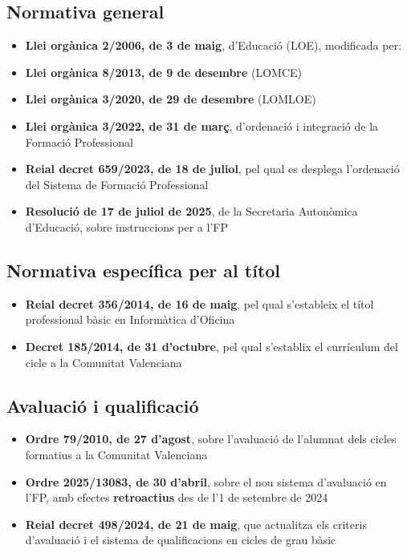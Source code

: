 \documentclass[
  paper=a4,
  ,captions=tableheading
]{scrartcl}
\providecommand{\tightlist}{%
  \setlength{\itemsep}{0pt}\setlength{\parskip}{0pt}}
\begin{document}
\hypertarget{normativa-general}{%
\subsection{Normativa general}\label{normativa-general}}

\begin{itemize}
\tightlist
\item
  \textbf{Llei orgànica 2/2006, de 3 de maig}, d'Educació (LOE),
  modificada per:
\item
  \textbf{Llei orgànica 8/2013, de 9 de desembre} (LOMCE)
\item
  \textbf{Llei orgànica 3/2020, de 29 de desembre} (LOMLOE)
\item
  \textbf{Llei orgànica 3/2022, de 31 de març}, d'ordenació i integració
  de la Formació Professional
\item
  \textbf{Reial decret 659/2023, de 18 de juliol}, pel qual es desplega
  l'ordenació del Sistema de Formació Professional
\item
  \textbf{Resolució de 17 de juliol de 2025}, de la Secretaria
  Autonòmica d'Educació, sobre instruccions per a l'FP
\end{itemize}

\hypertarget{normativa-especuxedfica-per-al-tuxedtol}{%
\subsection{Normativa específica per al
títol}\label{normativa-especuxedfica-per-al-tuxedtol}}

\begin{itemize}
\tightlist
\item
  \textbf{Reial decret 356/2014, de 16 de maig}, pel qual s'estableix el
  títol professional bàsic en Informàtica d'Oficina
\item
  \textbf{Decret 185/2014, de 31 d'octubre}, pel qual s'establix el
  currículum del cicle a la Comunitat Valenciana
\end{itemize}

\hypertarget{avaluaciuxf3-i-qualificaciuxf3}{%
\subsection{Avaluació i
qualificació}\label{avaluaciuxf3-i-qualificaciuxf3}}

\begin{itemize}
\tightlist
\item
  \textbf{Ordre 79/2010, de 27 d'agost}, sobre l'avaluació de l'alumnat
  dels cicles formatius a la Comunitat Valenciana
\item
  \textbf{Ordre 2025/13083, de 30 d'abril}, sobre el nou sistema
  d'avaluació en l'FP, amb efectes \textbf{retroactius} des de l'1 de
  setembre de 2024
\item
  \textbf{Reial decret 498/2024, de 21 de maig}, que actualitza els
  criteris d'avaluació i el sistema de qualificacions en cicles de grau
  bàsic
\end{itemize}
\end{document}

